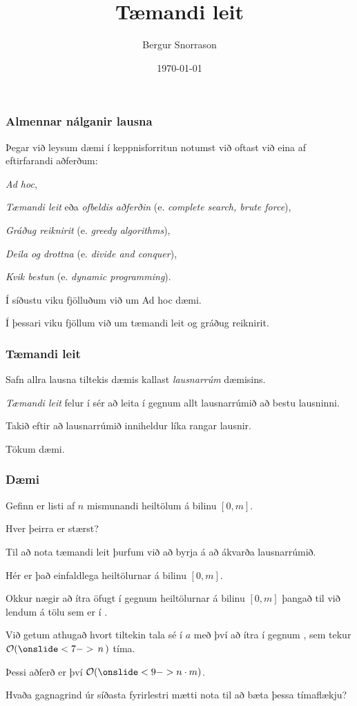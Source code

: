\title{Tæmandi leit}
\author{Bergur Snorrason}
\date{\today}



\frame{\titlepage}

{
	\frametitle{Almennar nálganir lausna}
	{
		\item<1-> Þegar við leysum dæmi í keppnisforritun notumst við oftast við eina af eftirfarandi aðferðum:
		{
			\item<2-> \emph{Ad hoc},
			\item<3-> \emph{Tæmandi leit} eða \emph{ofbeldis aðferðin} (e. \emph{complete search, brute force}),
			\item<4-> \emph{Gráðug reiknirit} (e. \emph{greedy algorithms}),
			\item<5-> \emph{Deila og drottna} (e. \emph{divide and conquer}),
			\item<6-> \emph{Kvik bestun} (e. \emph{dynamic programming}).
		}
		\item<7-> Í síðustu viku fjölluðum við um Ad hoc dæmi.
		\item<8-> Í þessari viku fjöllum við um tæmandi leit og gráðug reiknirit.
	}
}

{
	\frametitle{Tæmandi leit}
	{
		\item<1-> Safn allra lausna tiltekis dæmis kallast \emph{lausnarrúm} dæmisins.
		\item<2-> \emph{Tæmandi leit} felur í sér að leita í gegnum allt lausnarrúmið að bestu lausninni.
		\item<3-> Takið eftir að lausnarrúmið inniheldur líka rangar lausnir.
		\item<4-> Tökum dæmi.
	}
}

{
	\frametitle{Dæmi}
	{
		\item<1-> Gefinn er listi  af $n$ mismunandi heiltölum á bilinu $[0, m]$.
		\item<2-> Hver þeirra er stærst?
		\item<3-> Til að nota tæmandi leit þurfum við að byrja á að ákvarða lausnarrúmið.
		\item<4-> Hér er það einfaldlega heiltölurnar á bilinu $[0, m]$.
		\item<5-> Okkur nægir að ítra öfugt í gegnum heiltölurnar á bilinu $[0, m]$ þangað til við lendum á tölu sem er í .
		\item<6-> Við getum athugað hvort tiltekin tala sé í $a$ með því að ítra í gegnum ,
					sem tekur $\mathcal{O}(\onslide<7->{\,n\,})$ tíma.
		\item<8-> Þessi aðferð er því $\mathcal{O}(\onslide<9->{n \cdot m})$.
		\item<10-> Hvaða gagnagrind úr síðasta fyrirlestri mætti nota til að bæta þessa tímaflækju?
	}
}


